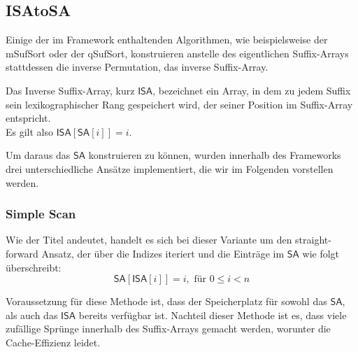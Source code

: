 \subsection{ISAtoSA}
\label{isa2sa}
Einige der im Framework enthaltenden Algorithmen, wie beispielsweise der mSufSort oder der qSufSort, konstruieren anstelle des eigentlichen Suffix-Arrays stattdessen die inverse Permutation, das inverse Suffix-Array. \\
\begin{definition}
Das Inverse Suffix-Array, kurz $\mathsf{ISA}$, bezeichnet ein Array, in dem zu jedem
Suffix sein lexikographischer Rang gespeichert wird, der seiner Position
im Suffix-Array entspricht.\\
Es gilt also $\mathsf{ISA}[\mathsf{SA}[i]]=i.$
\end{definition}
Um daraus das $\mathsf{SA}$ konstruieren zu können, wurden innerhalb des Frameworks drei unterschiedliche Ansätze implementiert, die wir im Folgenden vorstellen werden.
\subsubsection{Simple Scan}
Wie der Titel andeutet, handelt es sich bei dieser Variante um den straight-forward Ansatz, der über die Indizes iteriert und die Einträge im $\mathsf{SA}$ wie folgt überschreibt:
\begin{equation}
\mathsf{SA}[\mathsf{ISA}[i]]=i, \text{ für } 0\leq i < n
\end{equation}

Voraussetzung für diese Methode ist, dass der Speicherplatz für sowohl das $\mathsf{SA}$, als auch das $\mathsf{ISA}$ bereits verfügbar ist. Nachteil dieser Methode ist es, dass viele zufällige Sprünge innerhalb des Suffix-Arrays gemacht werden, worunter die Cache-Effizienz leidet. 
